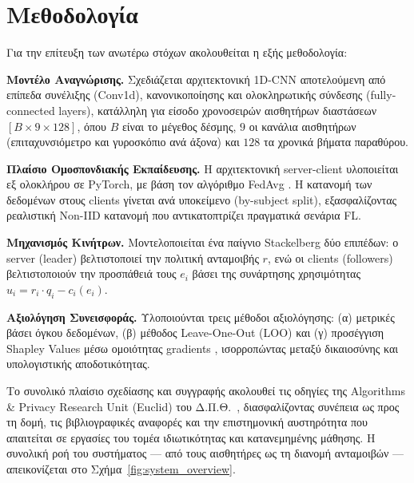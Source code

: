 
\section{Μεθοδολογία}
\label{sec:methodology}

Για την επίτευξη των ανωτέρω στόχων ακολουθείται η εξής μεθοδολογία:

\textbf{Μοντέλο Αναγνώρισης.} Σχεδιάζεται αρχιτεκτονική 1D-CNN
αποτελούμενη από επίπεδα συνέλιξης (Conv1d), κανονικοποίησης και
ολοκληρωτικής σύνδεσης (fully-connected layers), κατάλληλη για είσοδο
χρονοσειρών αισθητήρων διαστάσεων $[B \times 9 \times 128]$, όπου $B$
είναι το μέγεθος δέσμης, $9$ οι κανάλια αισθητήρων (επιταχυνσιόμετρο
και γυροσκόπιο ανά άξονα) και $128$ τα χρονικά βήματα παραθύρου.

\textbf{Πλαίσιο Ομοσπονδιακής Εκπαίδευσης.} Η αρχιτεκτονική
server-client υλοποιείται εξ ολοκλήρου σε PyTorch,
με βάση τον αλγόριθμο FedAvg \cite{McMahan2017}. Η κατανομή των
δεδομένων στους clients γίνεται ανά υποκείμενο (by-subject split), εξασφαλίζοντας
ρεαλιστική Non-IID κατανομή που αντικατοπτρίζει πραγματικά σενάρια FL.

\textbf{Μηχανισμός Κινήτρων.} Μοντελοποιείται ένα παίγνιο Stackelberg
δύο επιπέδων: ο server (leader) βελτιστοποιεί την πολιτική ανταμοιβής $r$,
ενώ οι clients (followers) βελτιστοποιούν την προσπάθειά τους $e_i$
βάσει της συνάρτησης χρησιμότητας $u_i = r_i \cdot q_i - c_i(e_i)$.

\textbf{Αξιολόγηση Συνεισφοράς.} Υλοποιούνται τρεις μέθοδοι
αξιολόγησης: (α) μετρικές βάσει όγκου δεδομένων, (β) μέθοδος
Leave-One-Out (LOO) και (γ) προσέγγιση Shapley Values μέσω ομοιότητας
gradients \cite{Xu2021}, ισορροπώντας μεταξύ δικαιοσύνης και
υπολογιστικής αποδοτικότητας.

Το συνολικό πλαίσιο σχεδίασης και συγγραφής ακολουθεί τις οδηγίες της Algorithms \& Privacy Research Unit (Euclid) του Δ.Π.Θ.\ \cite{Efraimidis2024}, διασφαλίζοντας συνέπεια ως προς τη δομή, τις βιβλιογραφικές αναφορές και την επιστημονική αυστηρότητα που απαιτείται σε εργασίες του τομέα ιδιωτικότητας και κατανεμημένης μάθησης. Η συνολική ροή του συστήματος — από τους αισθητήρες ως τη διανομή ανταμοιβών — απεικονίζεται στο Σχήμα~\ref{fig:system_overview}.

